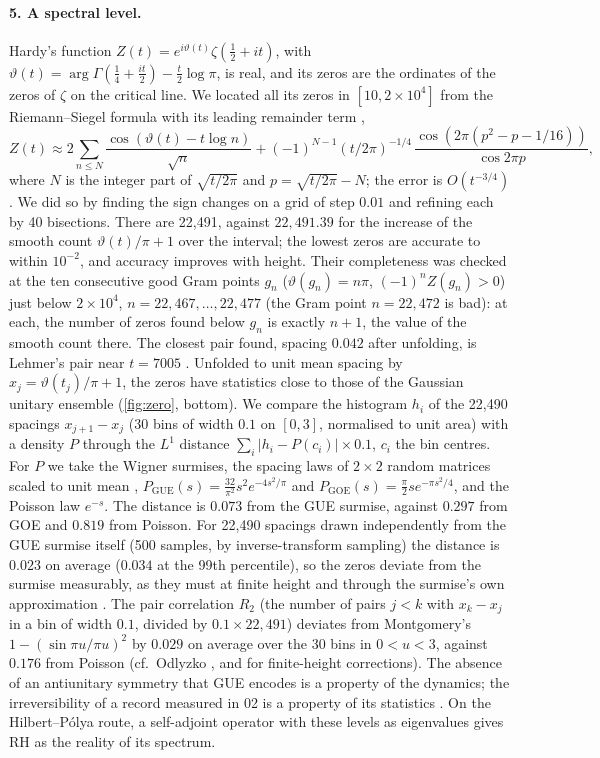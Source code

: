 \documentclass[11pt]{article}
\theoremstyle{definition}\newtheorem{definition}[theorem]{Definition}
\theoremstyle{remark}\newtheorem{remark}[theorem]{Remark}
\begin{document}
\paragraph{5. A spectral level.} Hardy's function $Z(t)=e^{i\vartheta(t)}\zeta(\frac12+it)$, with $\vartheta(t)=\arg\Gamma(\frac14+\frac{it}2)-\frac t2\log\pi$, is real, and its zeros are the ordinates of the zeros of $\zeta$ on the critical line. We located all its zeros in $[10,2\times10^4]$ from the Riemann--Siegel formula with its leading remainder term \cite[Ch.~IV]{Titchmarsh},
\[
Z(t)\approx2\sum_{n\le N}\frac{\cos(\vartheta(t)-t\log n)}{\sqrt n}+(-1)^{N-1}(t/2\pi)^{-1/4}\,\frac{\cos(2\pi(p^2-p-1/16))}{\cos2\pi p},
\]
where $N$ is the integer part of $\sqrt{t/2\pi}$ and $p=\sqrt{t/2\pi}-N$; the error is $O(t^{-3/4})$. We did so by finding the sign changes on a grid of step $0.01$ and refining each by 40 bisections. There are 22{,}491, against $22{,}491.39$ for the increase of the smooth count $\vartheta(t)/\pi+1$ over the interval; the lowest zeros are accurate to within $10^{-2}$, and accuracy improves with height. Their completeness was checked at the ten consecutive good Gram points $g_n$ ($\vartheta(g_n)=n\pi$, $(-1)^nZ(g_n)>0$) just below $2\times10^4$, $n=22{,}467,\dots,22{,}477$ (the Gram point $n=22{,}472$ is bad): at each, the number of zeros found below $g_n$ is exactly $n+1$, the value of the smooth count there. The closest pair found, spacing $0.042$ after unfolding, is Lehmer's pair near $t=7005$ \cite{Lehmer}. Unfolded to unit mean spacing by $x_j=\vartheta(t_j)/\pi+1$, the zeros have statistics close to those of the Gaussian unitary ensemble (\cref{fig:zero}, bottom). We compare the histogram $h_i$ of the 22{,}490 spacings $x_{j+1}-x_j$ (30 bins of width $0.1$ on $[0,3]$, normalised to unit area) with a density $P$ through the $L^1$ distance $\sum_i|h_i-P(c_i)|\times0.1$, $c_i$ the bin centres. For $P$ we take the Wigner surmises, the spacing laws of $2\times2$ random matrices scaled to unit mean \cite{Mehta}, $P_{\mathrm{GUE}}(s)=\frac{32}{\pi^2}s^2e^{-4s^2/\pi}$ and $P_{\mathrm{GOE}}(s)=\frac\pi2se^{-\pi s^2/4}$, and the Poisson law $e^{-s}$. The distance is $0.073$ from the GUE surmise, against $0.297$ from GOE and $0.819$ from Poisson. For 22{,}490 spacings drawn independently from the GUE surmise itself (500 samples, by inverse-transform sampling) the distance is $0.023$ on average ($0.034$ at the 99th percentile), so the zeros deviate from the surmise measurably, as they must at finite height and through the surmise's own approximation \cite{BBLM}. The pair correlation $R_2$ (the number of pairs $j<k$ with $x_k-x_j$ in a bin of width $0.1$, divided by $0.1\times22{,}491$) deviates from Montgomery's $1-(\sin\pi u/\pi u)^2$ \cite{Montgomery} by $0.029$ on average over the 30 bins in $0<u<3$, against $0.176$ from Poisson (cf.\ Odlyzko \cite{Odlyzko}, and \cite{BBLM} for finite-height corrections). The absence of an antiunitary symmetry that GUE encodes \cite{Berry,BerryKeating} is a property of the dynamics; the irreversibility of a record measured in 02 is a property of its statistics \cite{SPhys}. On the Hilbert--P\'olya route, a self-adjoint operator with these levels as eigenvalues gives RH as the reality of its spectrum.
\end{document}
